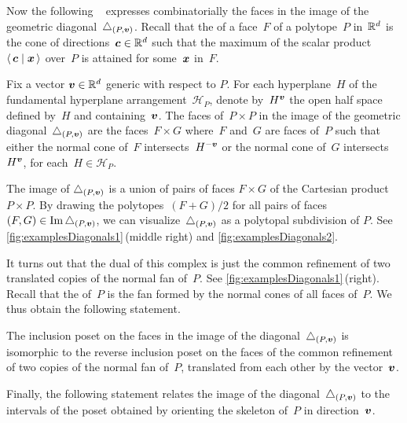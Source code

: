 Now the following ~\cite[Thm.~1.26]{LaplanteAnfossi} expresses combinatorially the faces in the image of the geometric diagonal~$\triangle_{(P,\boldsymbol{v})}$.
Recall that the  of a face~$F$ of a polytope~$P$ in~$\mathbb{R}^d$ is the cone of directions~$\boldsymbol{c} \in \mathbb{R}^d$ such that the maximum of the scalar product~$\left\langle \, \boldsymbol{c} \; \middle| \; \boldsymbol{x} \, \right\rangle$ over~$P$ is attained for some~$\boldsymbol{x}$ in~$F$.

\begin{theorem}
\label{thm:universalFormula}
Fix a vector $\boldsymbol{v} \in \mathbb{R}^d$ generic with respect to $P$.
For each hyperplane~$H$ of the fundamental hyperplane arrangement~$\mathcal{H}_P$, denote by~$H^{\boldsymbol{v}}$ the open half space defined by~$H$ and containing~$\boldsymbol{v}$.
The faces of~$P \times P$ in the image of the geometric diagonal~$\triangle_{(P,\boldsymbol{v})}$ are the faces~$F \times G$ where~$F$ and~$G$ are faces of~$P$ such that either the normal cone of~$F$ intersects~$H^{-\boldsymbol{v}}$ or the normal cone of~$G$ intersects~$H^{\boldsymbol{v}}$, for each~$H \in \mathcal{H}_P$.
\end{theorem}

The image of $\triangle_{(P,\boldsymbol{v})}$ is a union of pairs of faces $F \times G$ of the Cartesian product~$P \times P$.
By drawing the polytopes~${(F+G)/2}$ for all pairs of faces $(F,G) \in \operatorname{Im} \triangle_{(P,\boldsymbol{v})}$, we can visualize~$\triangle_{(P,\boldsymbol{v})}$ as a polytopal subdivision of $P$.
See \cref{fig:examplesDiagonals1}\,(middle right) and \cref{fig:examplesDiagonals2}.

It turns out that the dual of this complex is just the common refinement of two translated copies of the normal fan of~$P$.
See \cref{fig:examplesDiagonals1}\,(right).
Recall that the  of~$P$ is the fan formed by the normal cones of all faces of~$P$.
We thus obtain the following statement.

\begin{proposition}
\label{prop:diagonalCommonRefinement}
The inclusion poset on the faces in the image of the diagonal~$\triangle_{(P,\boldsymbol{v})}$ is isomorphic to the reverse inclusion poset on the faces of the common refinement of two copies of the normal fan of~$P$, translated from each other by the vector~$\boldsymbol{v}$. 
\end{proposition}

Finally, the following statement relates the image of the diagonal~$\triangle_{(P, \boldsymbol{v})}$ to the intervals of the poset obtained by orienting the skeleton of~$P$ in direction~$\boldsymbol{v}$.

